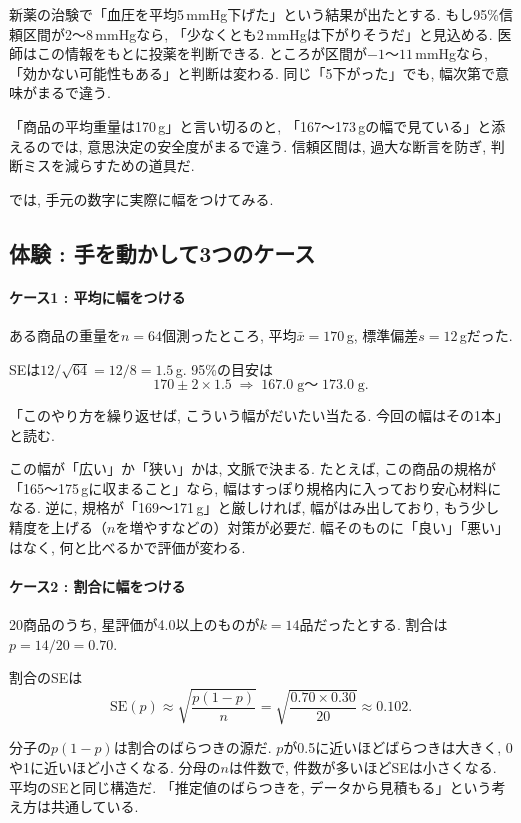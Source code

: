     新薬の治験で「血圧を平均5\,mmHg下げた」という結果が出たとする.
    もし95\%信頼区間が2〜8\,mmHgなら, 「少なくとも2\,mmHgは下がりそうだ」と見込める.
    医師はこの情報をもとに投薬を判断できる.
    ところが区間が$-1$〜$11$\,mmHgなら, 「効かない可能性もある」と判断は変わる.
    同じ「5下がった」でも, 幅次第で意味がまるで違う.

    「商品の平均重量は170\,g」と言い切るのと, 「167〜173\,gの幅で見ている」と添えるのでは, 意思決定の安全度がまるで違う.
    信頼区間は, 過大な断言を防ぎ, 判断ミスを減らすための道具だ.

    では, 手元の数字に実際に幅をつけてみる.


  \subsection{体験 : 手を動かして3つのケース}

    \paragraph{ケース1 : 平均に幅をつける}

    ある商品の重量を$n=64$個測ったところ, 平均$\bar{x} = 170$\,g, 標準偏差$s = 12$\,gだった.

    SEは$12/\sqrt{64} = 12/8 = 1.5$\,g.
    95\%の目安は
    \[
      170 \pm 2 \times 1.5 \;\Rightarrow\; 167.0\;\text{g〜}\;173.0\;\text{g}.
    \]

    「このやり方を繰り返せば, こういう幅がだいたい当たる. 今回の幅はその1本」と読む.

    この幅が「広い」か「狭い」かは, 文脈で決まる.
    たとえば, この商品の規格が「165〜175\,gに収まること」なら,
    幅はすっぽり規格内に入っており安心材料になる.
    逆に, 規格が「169〜171\,g」と厳しければ, 幅がはみ出しており,
    もう少し精度を上げる（$n$を増やすなどの）対策が必要だ.
    幅そのものに「良い」「悪い」はなく, 何と比べるかで評価が変わる.

    \paragraph{ケース2 : 割合に幅をつける}

    20商品のうち, 星評価が4.0以上のものが$k=14$品だったとする.
    割合は$p = 14/20 = 0.70$.

    割合のSEは
    \[
      \mathrm{SE}(p) \approx \sqrt{\frac{p(1-p)}{n}} = \sqrt{\frac{0.70 \times 0.30}{20}} \approx 0.102.
    \]

    分子の$p(1-p)$は割合のばらつきの源だ.
    $p$が0.5に近いほどばらつきは大きく, 0や1に近いほど小さくなる.
    分母の$n$は件数で, 件数が多いほどSEは小さくなる.
    平均のSEと同じ構造だ.
    「推定値のばらつきを, データから見積もる」という考え方は共通している.

